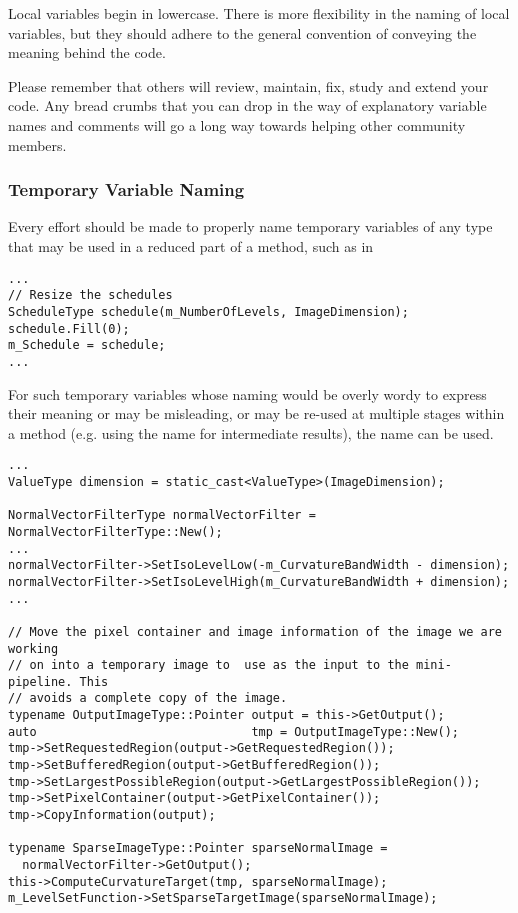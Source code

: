 Local variables begin in lowercase. There is more flexibility in the naming of
local variables, but they should adhere to the general convention of conveying
the meaning behind the code.

Please remember that others will review, maintain, fix, study and extend your
code. Any bread crumbs that you can drop in the way of explanatory variable
names and comments will go a long way towards helping other community members.


\subsubsection{Temporary Variable Naming}
\label{subsubsec:TemporaryVariableNaming}

Every effort should be made to properly name temporary variables of any type
that may be used in a reduced part of a method, such as in
\small
\begin{verbatim}
...
// Resize the schedules
ScheduleType schedule(m_NumberOfLevels, ImageDimension);
schedule.Fill(0);
m_Schedule = schedule;
...
\end{verbatim}
\normalsize

For such temporary variables whose naming would be overly wordy to
express their meaning or may be misleading, or may be re-used at multiple
stages within a method (e.g. using the name  for intermediate
results), the name  can be used.
\small
\begin{verbatim}
...
ValueType dimension = static_cast<ValueType>(ImageDimension);

NormalVectorFilterType normalVectorFilter = NormalVectorFilterType::New();
...
normalVectorFilter->SetIsoLevelLow(-m_CurvatureBandWidth - dimension);
normalVectorFilter->SetIsoLevelHigh(m_CurvatureBandWidth + dimension);
...

// Move the pixel container and image information of the image we are working
// on into a temporary image to  use as the input to the mini-pipeline. This
// avoids a complete copy of the image.
typename OutputImageType::Pointer output = this->GetOutput();
auto                              tmp = OutputImageType::New();
tmp->SetRequestedRegion(output->GetRequestedRegion());
tmp->SetBufferedRegion(output->GetBufferedRegion());
tmp->SetLargestPossibleRegion(output->GetLargestPossibleRegion());
tmp->SetPixelContainer(output->GetPixelContainer());
tmp->CopyInformation(output);

typename SparseImageType::Pointer sparseNormalImage =
  normalVectorFilter->GetOutput();
this->ComputeCurvatureTarget(tmp, sparseNormalImage);
m_LevelSetFunction->SetSparseTargetImage(sparseNormalImage);
\end{verbatim}
\normalsize


